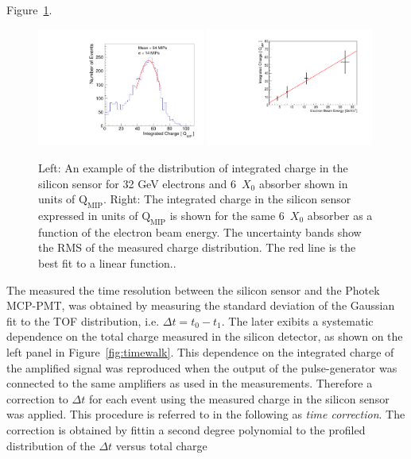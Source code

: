 Figure~\ref{fig:ChargeDistributionExample}.
\begin{figure}[h] 
\centering
\includegraphics[width=0.49\textwidth]{plots/Electron_6X0_32GeV_chargeMIP.pdf} 
\includegraphics[width=0.49\textwidth]{plots/MIPVsEnergyAt6X0.pdf} 
\caption{ Left: An example of the distribution of integrated charge in the
silicon sensor for 32 GeV electrons and $6$~$X_0$ absorber shown in units of 
$\mathrm{Q}_{\mathrm{MIP}}$. Right: The integrated charge in the silicon sensor 
expressed in units of $\mathrm{Q}_{\mathrm{MIP}}$
is shown for the same $6$~$X_0$ absorber as a function of the electron beam energy. 
The uncertainty bands show the RMS of the measured charge distribution. The red line
is the best fit to a linear function..} 
\label{fig:ChargeDistributionExample}
\end{figure}
The measured the time resolution between the silicon sensor and the Photek
MCP-PMT, was obtained by measuring the standard deviation of the Gaussian fit to the
TOF distribution, i.e. $\Delta t = t_0-t_1$. The later exibits a systematic dependence on the total charge measured in the silicon detector, as shown on the
left panel in Figure~\ref{fig:timewalk}. This dependence on the integrated
charge of the amplified signal was reproduced when the output of
the pulse-generator was connected to the same amplifiers as used in the measurements. Therefore
a correction to $\Delta t$ for each event using the measured charge in
the silicon sensor was applied. This procedure is referred to in the following as
\textit{time correction}. The correction is obtained by fittin a second degree
polynomial to the profiled distribution of the $\Delta t$ versus total charge
